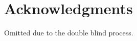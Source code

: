 \documentclass[letterpaper]{article}
\begin{document}
\section{Acknowledgments}
Omitted due to the double blind process. 

%


%
%
\end{document}
